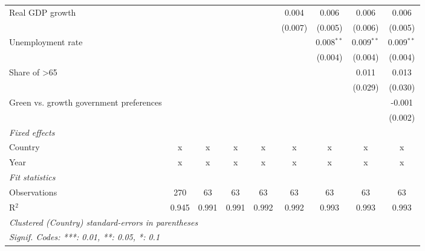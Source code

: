 \begin{table}[htbp]
\begin{tabular}{lcccccccc}
      Real GDP growth                                                                   &         &         &         &             & 0.004        & 0.006        & 0.006        & 0.006\\   
                                                                                        &         &         &         &             & (0.007)      & (0.005)      & (0.006)      & (0.005)\\   
      Unemployment rate                                                                 &         &         &         &             &              & 0.008$^{**}$ & 0.009$^{**}$ & 0.009$^{**}$\\   
                                                                                        &         &         &         &             &              & (0.004)      & (0.004)      & (0.004)\\   
      Share of >65                                                                      &         &         &         &             &              &              & 0.011        & 0.013\\   
                                                                                        &         &         &         &             &              &              & (0.029)      & (0.030)\\   
      Green vs. growth government preferences                                           &         &         &         &             &              &              &              & -0.001\\   
                                                                                        &         &         &         &             &              &              &              & (0.002)\\   
      \emph{Fixed effects}\\
      Country                                                                           & x       & x       & x       & x           & x            & x            & x            & x\\  
      Year                                                                              & x       & x       & x       & x           & x            & x            & x            & x\\  
      \midrule \emph{Fit statistics}\\
      Observations                                                                      & 270     & 63      & 63      & 63          & 63           & 63           & 63           & 63\\  
      R$^2$                                                                             & 0.945   & 0.991   & 0.991   & 0.992       & 0.992        & 0.993        & 0.993        & 0.993\\  
      \midrule
      \multicolumn{9}{l}{\emph{Clustered (Country) standard-errors in parentheses}}\\
      \multicolumn{9}{l}{\emph{Signif. Codes: ***: 0.01, **: 0.05, *: 0.1}}\\
   \end{tabular}
\end{table}


